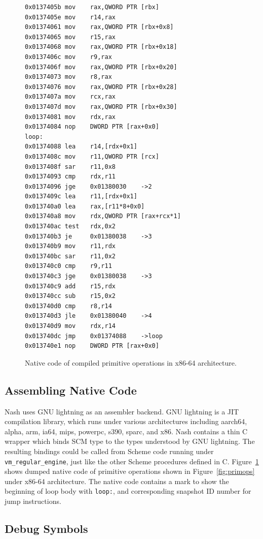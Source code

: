 \documentclass[preprint, numbers]{sigplanconf}
\begin{document}
\begin{figure}
  \centering
\begin{verbatim}
0x0137405b mov    rax,QWORD PTR [rbx]
0x0137405e mov    r14,rax
0x01374061 mov    rax,QWORD PTR [rbx+0x8]
0x01374065 mov    r15,rax
0x01374068 mov    rax,QWORD PTR [rbx+0x18]
0x0137406c mov    r9,rax
0x0137406f mov    rax,QWORD PTR [rbx+0x20]
0x01374073 mov    r8,rax
0x01374076 mov    rax,QWORD PTR [rbx+0x28]
0x0137407a mov    rcx,rax
0x0137407d mov    rax,QWORD PTR [rbx+0x30]
0x01374081 mov    rdx,rax
0x01374084 nop    DWORD PTR [rax+0x0]
loop:
0x01374088 lea    r14,[rdx+0x1]
0x0137408c mov    r11,QWORD PTR [rcx]
0x0137408f sar    r11,0x8
0x01374093 cmp    rdx,r11
0x01374096 jge    0x01380030    ->2
0x0137409c lea    r11,[rdx+0x1]
0x013740a0 lea    rax,[r11*8+0x0]
0x013740a8 mov    rdx,QWORD PTR [rax+rcx*1]
0x013740ac test   rdx,0x2
0x013740b3 je     0x01380038    ->3
0x013740b9 mov    r11,rdx
0x013740bc sar    r11,0x2
0x013740c0 cmp    r9,r11
0x013740c3 jge    0x01380038    ->3
0x013740c9 add    r15,rdx
0x013740cc sub    r15,0x2
0x013740d0 cmp    r8,r14
0x013740d3 jle    0x01380040    ->4
0x013740d9 mov    rdx,r14
0x013740dc jmp    0x01374088    ->loop
0x013740e1 nop    DWORD PTR [rax+0x0]
\end{verbatim}
\caption{Native code of compiled primitive operations in x86-64 architecture.}
\label{fig:ncode}
\end{figure}

\subsection{Assembling Native Code}
Nash uses GNU lightning\cite{gnulightning} as an assembler backend.  GNU
lightning is a JIT compilation library, which runs under various architectures
including aarch64, alpha, arm, ia64, mips, powerpc, s390, sparc, and x86. Nash
contains a thin C wrapper which binds SCM type to the types understood by GNU
lightning. The resulting bindings could be called from Scheme code running
under \texttt{vm\_regular\_engine}, just like the other Scheme procedures
defined in C. Figure~\hyperref[fig:native]{\ref{fig:ncode}} shows dumped
native code of primitive operations shown in
Figure~\hyperref[fig:primops]{\ref{fig:primops}} under x86-64
architecture. The native code contains a mark to show the beginning of loop
body with \texttt{loop:}, and corresponding snapshot ID number for jump
instructions.

\subsection{Debug Symbols}
\end{document}
